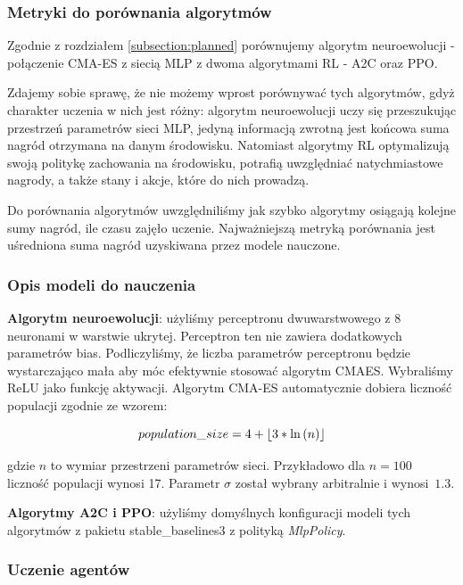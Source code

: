 \documentclass[12pt,a4paper]{article}
\DeclarePairedDelimiter\floor{\lfloor}{\rfloor}
\begin{document}
\subsubsection{Metryki do porównania algorytmów}

Zgodnie z rozdziałem \ref{subsection:planned} porównujemy
algorytm neuroewolucji - połączenie CMA-ES z siecią MLP z dwoma algorytmami
RL - A2C oraz PPO.

Zdajemy sobie sprawę, że nie możemy wprost porównywać tych algorytmów, gdyż
charakter uczenia w nich jest różny: algorytm neuroewolucji uczy się
przeszukując przestrzeń parametrów sieci MLP, jedyną informacją zwrotną jest
końcowa suma nagród otrzymana na danym środowisku. Natomiast algorytmy
RL optymalizują swoją politykę zachowania na środowisku, potrafią
uwzględniać natychmiastowe nagrody, a także stany i akcje, które do nich
prowadzą.

Do porównania algorytmów uwzględniliśmy jak szybko algorytmy osiągają
kolejne sumy nagród, ile czasu zajęło uczenie. Najważniejszą metryką
porównania jest uśredniona suma nagród uzyskiwana  przez modele nauczone.

\subsubsection{Opis modeli do nauczenia}

\textbf{Algorytm neuroewolucji}: użyliśmy perceptronu
dwuwarstwowego z 8 neuronami w warstwie ukrytej. Perceptron ten nie zawiera
dodatkowych parametrów bias. Podliczyliśmy, że liczba parametrów perceptronu
będzie wystarczająco mała aby móc efektywnie stosować algorytm CMAES.
Wybraliśmy ReLU jako funkcję aktywacji.  Algorytm \mbox{CMA-ES} automatycznie
dobiera liczność populacji zgodnie ze wzorem:

\begin{equation*}
  population\_size = 4 + \floor{3 * \ln{(n)} }
\end{equation*}

gdzie $n$ to wymiar przestrzeni parametrów sieci. Przykładowo
dla $ n = 100 $ liczność populacji wynosi 17. Parametr $\sigma$
został wybrany arbitralnie i \mbox{wynosi $1.3$}.

\bigskip

\noindent\textbf{Algorytmy A2C i PPO}: użyliśmy domyślnych konfiguracji
modeli tych algorytmów z pakietu stable\_baselines3 z polityką
\emph{MlpPolicy}.

\subsubsection{Uczenie agentów}
\end{document}
